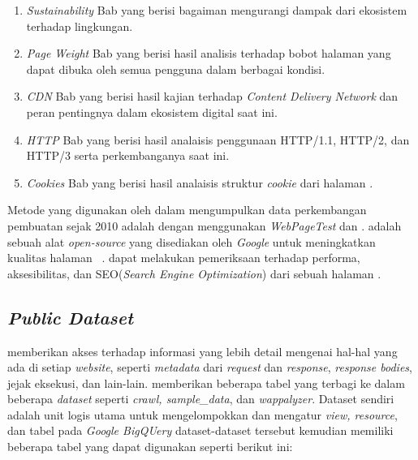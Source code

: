 \begin{enumerate}
    \item \textit{Sustainability} Bab yang berisi bagaiman mengurangi dampak dari ekosistem \web terhadap lingkungan.
    \item \textit{Page Weight} Bab yang berisi hasil analisis terhadap bobot halaman yang dapat dibuka oleh semua pengguna dalam berbagai kondisi.
    \item \textit{CDN} Bab yang berisi hasil kajian terhadap \textit{Content Delivery Network} dan peran pentingnya dalam ekosistem digital saat ini.
    \item \textit{HTTP} Bab yang berisi hasil analaisis penggunaan HTTP/1.1, HTTP/2, dan HTTP/3 serta perkembanganya saat ini.
    \item \textit{Cookies} Bab yang berisi hasil analaisis struktur \textit{cookie} dari halaman \web.
\end{enumerate}

Metode yang digunakan oleh \http dalam mengumpulkan data perkembangan pembuatan \web sejak 2010 adalah dengan menggunakan \textit{WebPageTest} dan \light. \light adalah sebuah alat \textit{open-source} yang disediakan oleh \textit{Google} untuk meningkatkan kualitas halaman \web~\cite{lighthouse}. \light dapat melakukan pemeriksaan terhadap performa, aksesibilitas, dan SEO(\textit{Search Engine Optimization}) dari sebuah halaman \web.

\subsection{\textit{Public Dataset}}
\label{subsec:pd}
\http memberikan akses terhadap informasi yang lebih detail mengenai hal-hal yang ada di setiap \textit{website}, seperti \textit{metadata} dari \textit{request} dan \textit{response}, \textit{response bodies}, jejak eksekusi, dan lain-lain. \http memberikan beberapa tabel yang terbagi ke dalam beberapa \textit{dataset} seperti \textit{crawl, sample\_data}, dan \textit{wappalyzer}. Dataset sendiri adalah unit logis utama untuk mengelompokkan dan mengatur \textit{view, resource}, dan tabel pada \textit{Google BigQUery} dataset-dataset tersebut kemudian memiliki beberapa tabel yang dapat digunakan seperti berikut ini:

